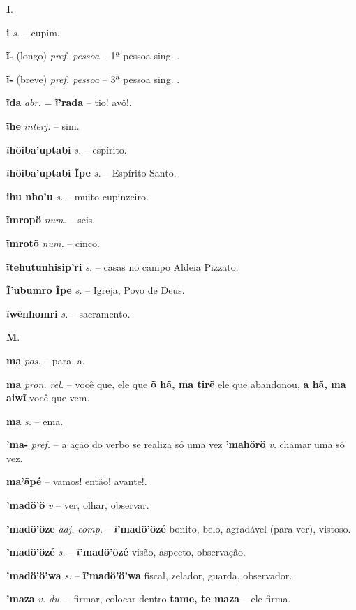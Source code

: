 \textbf{I}.



\textbf{i} \textit{s.} -- cupim.

\textbf{ĩ-} (longo) \textit{pref. pessoa} -- 1ª pessoa sing. .

\textbf{ĩ-} (breve) \textit{pref. pessoa} -- 3ª pessoa sing. .

\textbf{ĩda} \textit{abr.} = \textbf{ĩ'rada} -- tio! avô!.

\textbf{ĩhe} \textit{interj.} -- sim.

\textbf{ĩhöiba'uptabi} \textit{s.} -- espírito.

\textbf{ĩhöiba'uptabi Ĩpe} \textit{s.} -- Espírito Santo.

\textbf{ihu nho'u} \textit{s.} -- muito cupinzeiro.

\textbf{ĩmropö} \textit{num.} -- seis.

\textbf{ĩmrotõ} \textit{num.} -- cinco.

\textbf{ĩtehutunhisip'ri} \textit{s.} -- casas no campo  Aldeia Pizzato.

\textbf{Ĩ'ubumro Ĩpe} \textit{s.} -- Igreja, Povo de Deus.

\textbf{ĩwẽnhomri} \textit{s.} -- sacramento.



\textbf{M}.



\textbf{ma} \textit{pos.} -- para, a.

\textbf{ma} \textit{pron. rel.} -- você que, ele que  \textbf{õ hã, ma tirẽ} ele que abandonou, \textbf{a hã, ma aiwĩ} você que vem.

\textbf{ma} \textit{s.} -- ema.

\textbf{'ma-} \textit{pref.} -- a ação do verbo se realiza só uma vez  \textbf{'mahörö} \textit{v.} chamar uma só vez.

\textbf{ma'ãpé} -- vamos! então! avante!.

\textbf{'madö'ö} \textit{v} -- ver, olhar, observar.

\textbf{'madö'öze} \textit{adj. comp.} -- \textbf{ĩ'madö'özé} bonito, belo, agradável (para ver), vistoso.

\textbf{'madö'özé} \textit{s.} -- \textbf{ĩ'madö'özé} visão, aspecto, observação.

\textbf{'madö'ö'wa} \textit{s.} -- \textbf{ĩ'madö'ö'wa} fiscal, zelador, guarda, observador.

\textbf{'maza} \textit{v. du.} -- firmar, colocar dentro  \textbf{tame, te maza} -- ele firma.

